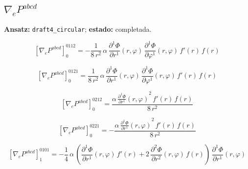 \documentclass[11pt]{article}
\begin{document}
\subsection*{$ \nabla_e P^{abcd} $}
\textbf{Ansatz:} \texttt{draft4\_circular}; \textbf{estado:} completada.\par
\begin{dmath*}[breakdepth={5}]
\left[\nabla_e P^{abcd}\right]_{0}^{0112} = -\frac{1}{8\,{r}^{2}}\,\alpha\,\frac{\partial^{1} \Phi}{\partial r^{1}}\!\left(r, \varphi\right)\,\frac{\partial^{1} \Phi}{\partial \varphi^{1}}\!\left(r, \varphi\right)\,f'\!\left(r\right)\,f\!\left(r\right)
\end{dmath*}
\par\smallskip
\begin{dmath*}[breakdepth={5}]
\left[\nabla_e P^{abcd}\right]_{0}^{0121} = \frac{1}{8\,{r}^{2}}\,\alpha\,\frac{\partial^{1} \Phi}{\partial r^{1}}\!\left(r, \varphi\right)\,\frac{\partial^{1} \Phi}{\partial \varphi^{1}}\!\left(r, \varphi\right)\,f'\!\left(r\right)\,f\!\left(r\right)
\end{dmath*}
\par\smallskip
\begin{dmath*}[breakdepth={5}]
\left[\nabla_e P^{abcd}\right]_{0}^{0212} = \frac{\alpha\,{\frac{\partial^{1} \Phi}{\partial r^{1}}\!\left(r, \varphi\right)}^{2}\,f'\!\left(r\right)\,f\!\left(r\right)}{8\,{r}^{2}}
\end{dmath*}
\par\smallskip
\begin{dmath*}[breakdepth={5}]
\left[\nabla_e P^{abcd}\right]_{0}^{0221} = -\frac{\alpha\,{\frac{\partial^{1} \Phi}{\partial r^{1}}\!\left(r, \varphi\right)}^{2}\,f'\!\left(r\right)\,f\!\left(r\right)}{8\,{r}^{2}}
\end{dmath*}
\par\smallskip
\begin{dmath*}[breakdepth={5}]
\left[\nabla_e P^{abcd}\right]_{1}^{0101} = -\frac{1}{4}\,\alpha\,\left(\frac{\partial^{1} \Phi}{\partial r^{1}}\!\left(r, \varphi\right)\,f'\!\left(r\right) + 2\,\frac{\partial^{2} \Phi}{\partial r^{2}}\!\left(r, \varphi\right)\,f\!\left(r\right)\right)\,\frac{\partial^{1} \Phi}{\partial r^{1}}\!\left(r, \varphi\right)
\end{dmath*}
\end{document}
